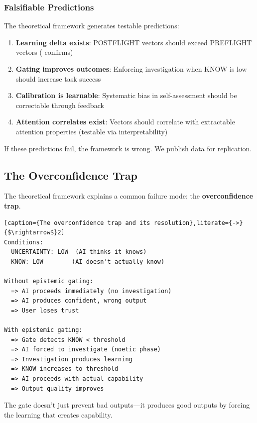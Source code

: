 \subsubsection{Falsifiable Predictions}

The theoretical framework generates testable predictions:

\begin{enumerate}
    \item \textbf{Learning delta exists}: POSTFLIGHT vectors should exceed PREFLIGHT vectors ( confirms)
    \item \textbf{Gating improves outcomes}: Enforcing investigation when KNOW is low should increase task success
    \item \textbf{Calibration is learnable}: Systematic bias in self-assessment should be correctable through feedback
    \item \textbf{Attention correlates exist}: Vectors should correlate with extractable attention properties (testable via interpretability)
\end{enumerate}

If these predictions fail, the framework is wrong. We publish data for replication.

\subsection{The Overconfidence Trap}

The theoretical framework explains a common failure mode: the \textbf{overconfidence trap}.

\begin{lstlisting}[caption={The overconfidence trap and its resolution},literate={->}{$\rightarrow$}2]
Conditions:
  UNCERTAINTY: LOW  (AI thinks it knows)
  KNOW: LOW        (AI doesn't actually know)

Without epistemic gating:
  => AI proceeds immediately (no investigation)
  => AI produces confident, wrong output
  => User loses trust

With epistemic gating:
  => Gate detects KNOW < threshold
  => AI forced to investigate (noetic phase)
  => Investigation produces learning
  => KNOW increases to threshold
  => AI proceeds with actual capability
  => Output quality improves
\end{lstlisting}

The gate doesn't just prevent bad outputs---it produces good outputs by forcing the learning that creates capability.

